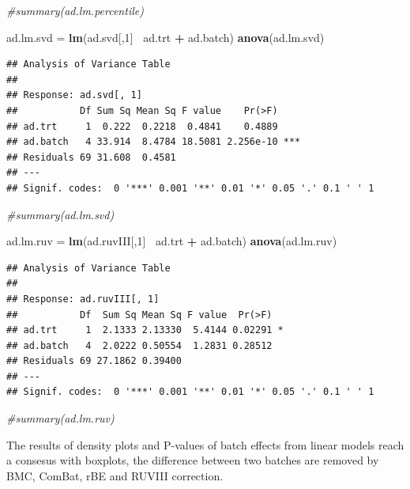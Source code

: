 \documentclass[]{book}
\newenvironment{Shaded}{\begin{snugshade}}{\end{snugshade}}
\newcommand{\KeywordTok}[1]{\textcolor[rgb]{0.13,0.29,0.53}{\textbf{#1}}}
\newcommand{\DecValTok}[1]{\textcolor[rgb]{0.00,0.00,0.81}{#1}}
\newcommand{\StringTok}[1]{\textcolor[rgb]{0.31,0.60,0.02}{#1}}
\newcommand{\CommentTok}[1]{\textcolor[rgb]{0.56,0.35,0.01}{\textit{#1}}}
\newcommand{\OperatorTok}[1]{\textcolor[rgb]{0.81,0.36,0.00}{\textbf{#1}}}
\newcommand{\NormalTok}[1]{#1}
\begin{document}
\begin{Shaded}
\begin{Highlighting}[]
\CommentTok{#summary(ad.lm.percentile)}

\NormalTok{ad.lm.svd =}\StringTok{ }\KeywordTok{lm}\NormalTok{(ad.svd[,}\DecValTok{1}\NormalTok{]}\OperatorTok{~}\StringTok{ }\NormalTok{ad.trt }\OperatorTok{+}\StringTok{ }\NormalTok{ad.batch)}
\KeywordTok{anova}\NormalTok{(ad.lm.svd)}
\end{Highlighting}
\end{Shaded}

\begin{verbatim}
## Analysis of Variance Table
## 
## Response: ad.svd[, 1]
##           Df Sum Sq Mean Sq F value    Pr(>F)    
## ad.trt     1  0.222  0.2218  0.4841    0.4889    
## ad.batch   4 33.914  8.4784 18.5081 2.256e-10 ***
## Residuals 69 31.608  0.4581                      
## ---
## Signif. codes:  0 '***' 0.001 '**' 0.01 '*' 0.05 '.' 0.1 ' ' 1
\end{verbatim}

\begin{Shaded}
\begin{Highlighting}[]
\CommentTok{#summary(ad.lm.svd)}


\NormalTok{ad.lm.ruv =}\StringTok{ }\KeywordTok{lm}\NormalTok{(ad.ruvIII[,}\DecValTok{1}\NormalTok{]}\OperatorTok{~}\StringTok{ }\NormalTok{ad.trt }\OperatorTok{+}\StringTok{ }\NormalTok{ad.batch)}
\KeywordTok{anova}\NormalTok{(ad.lm.ruv)}
\end{Highlighting}
\end{Shaded}

\begin{verbatim}
## Analysis of Variance Table
## 
## Response: ad.ruvIII[, 1]
##           Df  Sum Sq Mean Sq F value  Pr(>F)  
## ad.trt     1  2.1333 2.13330  5.4144 0.02291 *
## ad.batch   4  2.0222 0.50554  1.2831 0.28512  
## Residuals 69 27.1862 0.39400                  
## ---
## Signif. codes:  0 '***' 0.001 '**' 0.01 '*' 0.05 '.' 0.1 ' ' 1
\end{verbatim}

\begin{Shaded}
\begin{Highlighting}[]
\CommentTok{#summary(ad.lm.ruv)}
\end{Highlighting}
\end{Shaded}

The results of density plots and P-values of batch effects from linear
models reach a consesus with boxplots, the difference between two
batches are removed by BMC, ComBat, rBE and RUVIII correction.
\end{document}

